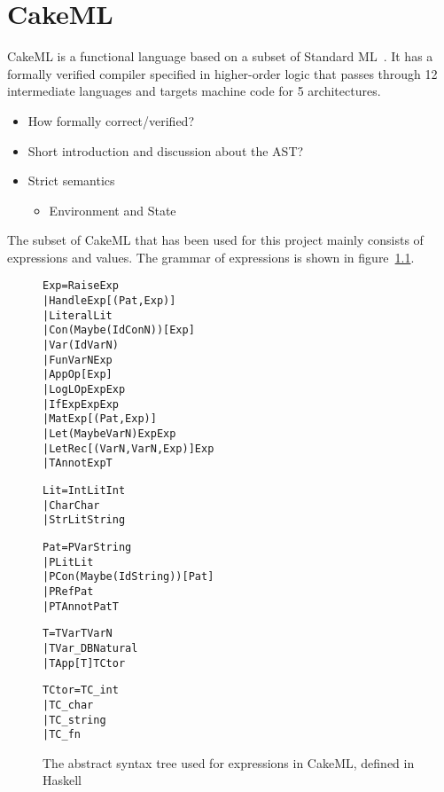 \chapter{CakeML}

CakeML is a functional language based on a subset of
Standard ML~\cite{CakeML25:online}. It has a
formally verified compiler specified in higher-order logic that passes through
12 intermediate languages and targets machine code for 5 architectures.

\begin{itemize}
\item How formally correct/verified?
\item Short introduction and discussion about the AST?
\item Strict semantics
  \begin{itemize}
  \item Environment and State
  \end{itemize}
\end{itemize}


The subset of CakeML that has been used for this project mainly
consists of expressions and values.
The grammar of expressions is shown in figure~\ref{CakeAST}.

\vspace{\fboxsep}
\begin{figure}
\begin{alltt}
  Exp   = Raise Exp
        | Handle Exp [(Pat, Exp)]
        | Literal Lit
        | Con (Maybe (Id ConN)) [Exp]
        | Var (Id VarN)
        | Fun VarN Exp
        | App Op [Exp]
        | Log LOp Exp Exp
        | If Exp Exp Exp
        | Mat Exp [(Pat, Exp)]
        | Let (Maybe VarN) Exp Exp
        | LetRec [(VarN, VarN, Exp)] Exp
        | TAnnot Exp T
\end{alltt}
\begin{alltt}
  Lit   = IntLit Int
        | Char Char
        | StrLit String
\end{alltt}
\begin{alltt}
  Pat   = PVar String
        | PLit Lit
        | PCon (Maybe (Id String)) [Pat]
        | PRef Pat
        | PTAnnot Pat T
\end{alltt}
\begin{alltt}
  T     = TVar TVarN
        | TVar_DB Natural
        | TApp [T] TCtor
\end{alltt}
\begin{alltt}
  TCtor = TC_int
        | TC_char
        | TC_string
        | TC_fn
\end{alltt}
\caption[CakeAST]{The abstract syntax tree used for expressions in CakeML, defined in Haskell}
\label{CakeAST}
\end{figure}
\vspace{\fboxsep}
